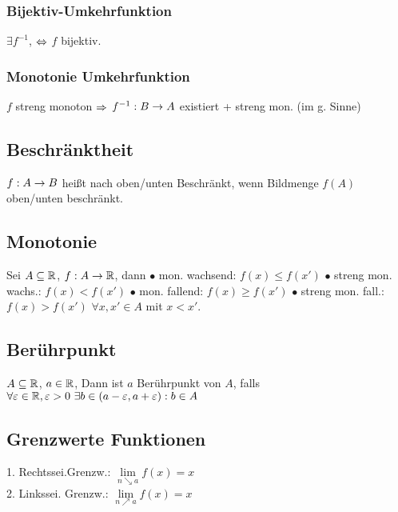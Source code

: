 \subsubsection*{Bijektiv-Umkehrfunktion}
$\exists f^{-1}$, $\Leftrightarrow$ $f$ bijektiv.
\subsubsection*{Monotonie Umkehrfunktion}
$f$ streng monoton $\Rightarrow$ $f^{-1}:B \rightarrow A$ existiert + streng mon. (im g. Sinne)
\subsection*{Beschränktheit}
$f: A \rightarrow B$ heißt nach oben/unten Beschränkt, wenn Bildmenge $f(A)$ oben/unten beschränkt.
\subsection*{Monotonie}
Sei $A \subseteq \mathbb R$, $f: A \rightarrow \mathbb R$, dann
    $\bullet$ mon. wachsend: $f(x) \leq f(x')$
    $\bullet$ streng mon. wachs.: $f(x) < f(x')$
    $\bullet$ mon. fallend: $f(x) \geq f(x')$
    $\bullet$ streng mon. fall.: $f(x) > f(x')$
$\forall x, x' \in A$ mit $x < x'$.
\subsection*{Berührpunkt}
$A \subseteq \mathbb R$, $a \in \mathbb R$, Dann ist $a$ Berührpunkt von $A$, falls $\forall \varepsilon \in \mathbb R, \varepsilon > 0 \ \exists b \in  (a - \varepsilon, a + \varepsilon): b \in A$
\subsection*{Grenzwerte Funktionen}
     1. Rechtssei.Grenzw.: 
     $\lim\limits_{n \searrow a} f(x) = x$\\
     2. Linkssei. Grenzw.: 
     $\lim\limits_{n \nearrow a} f(x) = x$
